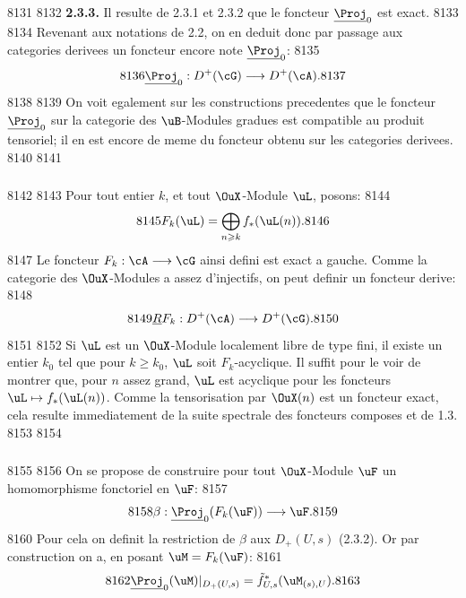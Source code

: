   8131	
  8132	\textbf{2.3.3.} Il resulte de 2.3.1 et 2.3.2 que le foncteur $\underline{\Proj}_0$ est exact.
  8133	
  8134	Revenant aux notations de 2.2, on en deduit donc par passage aux categories derivees un foncteur encore note $\underline{\Proj}_0$:
  8135	\[
  8136	\underline{\Proj}_0 : D^+(\cG) \longrightarrow D^+(\cA).
  8137	\]
  8138	
  8139	On voit egalement sur les constructions precedentes que le foncteur $\underline{\Proj}_0$ sur la categorie des $\uB$-Modules gradues est compatible au produit tensoriel; il en est encore de meme du foncteur obtenu sur les categories derivees.
  8140	
  8141	\subsubsection{}
  8142	
  8143	Pour tout entier $k$, et tout $\OuX$-Module $\uL$, posons:
  8144	\begin{equation}\label{eq:2.4.1}
  8145	F_k(\uL) = \bigoplus_{n \geqslant k} f_*(\uL(n)).
  8146	\end{equation}
  8147	Le foncteur $F_k : \cA \longrightarrow \cG$ ainsi defini est exact a gauche. Comme la categorie des $\OuX$-Modules a assez d'injectifs, on peut definir un foncteur derive:
  8148	\begin{equation}\label{eq:2.4.2}
  8149	\underline{R}F_k : D^+(\cA) \longrightarrow D^+(\cG).
  8150	\end{equation}
  8151	
  8152	Si $\uL$ est un $\OuX$-Module localement libre de type fini, il existe un entier $k_0$ tel que pour $k \geqslant k_0$, $\uL$ soit $F_k$-acyclique. Il suffit pour le voir de montrer que, pour $n$ assez grand, $\uL$ est acyclique pour les foncteurs $\uL \mapsto f_*(\uL(n))$. Comme la tensorisation par $\OuX(n)$ est un foncteur exact, cela resulte immediatement de la suite spectrale des foncteurs composes et de 1.3.
  8153	
  8154	\subsubsection{}
  8155	
  8156	On se propose de construire pour tout $\OuX$-Module $\uF$ un homomorphisme fonctoriel en $\uF$:
  8157	\begin{equation}\label{eq:2.5.1}
  8158	\beta: \underline{\Proj}_0(F_k(\uF)) \longrightarrow \uF.
  8159	\end{equation}
  8160	Pour cela on definit la restriction de $\beta$ aux $D_+(U,s)$ (2.3.2). Or par construction on a, en posant $\uM = F_k(\uF)$:
  8161	\[
  8162	\underline{\Proj}_0(\uM)|_{D_+(U,s)} = \tilde{f}_{U,s}^*(\uM_{(s),U}).
  8163	\]
